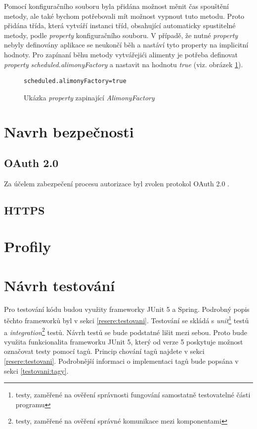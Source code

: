             Pomocí konfiguračního souboru byla přidána možnost měnit čas spouštění metody, ale také bychom potřebovali mít možnost vypnout tuto metodu. Proto přidána třída, která vytváří instanci tříd, obsahující automaticky spustitelné metody, podle \textit{property} konfiguračního souboru. V případě, že nutné \textit{property} nebyly definovány aplikace se neukončí běh a nastáví tyto property na implicitní hodnoty. Pro zapínaní běhu metody vytvářejići alimenty je potřeba definovat \textit{property} \textit{scheduled.alimonyFactory} a nastavit na hodnotu \textit{true} (viz. obrázek \ref{code:alimony-factory-true}).
            \begin{figure}
                \begin{verbatim}
scheduled.alimonyFactory=true
                \end{verbatim}
                \caption{Ukázka \textit{property} zapinající \textit{AlimonyFactory}} 
                \label{code:alimony-factory-true}
            \end{figure}
            
\section{Navrh bezpečnosti}\label{navrh:bezpecnost}
    \subsection{OAuth 2.0}
        Za účelem zabezpečení procesu autorizace byl zvolen protokol OAuth 2.0 . 
    \subsection{HTTPS}
\section{Profily}\label{navrh:profily}
\section{Návrh testování}\label{navrh:testovani}
    Pro testování kódu budou využity frameworky JUnit 5 a Spring. Podrobný popis těchto frameworků byl v sekci \ref{resere:testovani}. Testování se skládá s \textit{unit}\footnote{testy, zaměřené na ověření správnosti fungování samostatně testovatelné části programu} testů a \textit{integration}\footnote{testy, zaměřené na ověření správné komunikace mezi komponentami} testů. Návrh testů se bude podstatné lišit mezi sebou. Proto bude využita funkcionalita frameworku JUnit 5, který od verze 5 poskytuje možnost označovat testy pomocí tagů. Princip chování tagů najdete v sekci \ref{resere:testovani}. Podrobnější informaci o implementaci tagů bude popsána v sekci \ref{testovani:tagy}.
